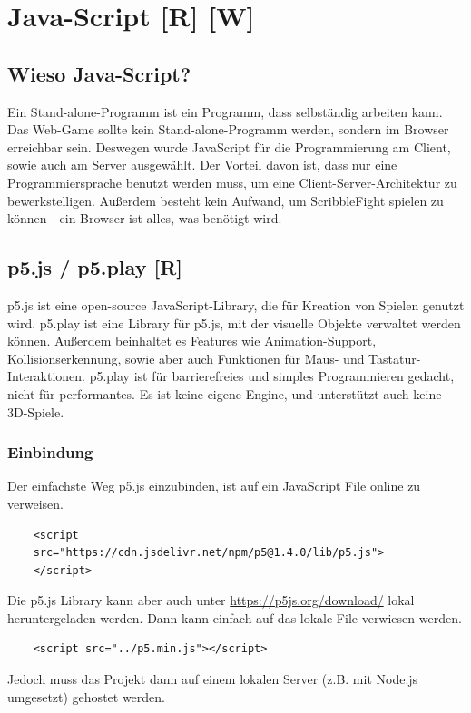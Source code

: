 
\section{Java-Script [R] [W]}
\subsection{Wieso Java-Script?}
Ein Stand-alone-Programm ist ein Programm, dass selbständig arbeiten kann.
Das Web-Game sollte kein Stand-alone-Programm werden, sondern im Browser erreichbar sein. Deswegen wurde JavaScript für die Programmierung am Client, sowie auch am Server ausgewählt.
Der Vorteil davon ist, dass nur eine Programmiersprache benutzt werden muss, um eine Client-Server-Architektur zu bewerkstelligen.
Außerdem besteht kein Aufwand, um ScribbleFight spielen zu können - ein Browser ist alles, was benötigt wird.
\subsection{p5.js / p5.play [R]}
\label{subsection:p5js}\cite{p5js}
p5.js ist eine open-source JavaScript-Library, die für Kreation von Spielen genutzt wird.
p5.play ist eine Library für p5.js, mit der visuelle Objekte verwaltet werden können. Außerdem beinhaltet es Features wie Animation-Support,
Kollisionserkennung, sowie aber auch Funktionen für Maus- und Tastatur-Interaktionen.
p5.play ist für barrierefreies und simples Programmieren gedacht, nicht für performantes.
Es ist keine eigene Engine, und unterstützt auch keine 3D-Spiele.

\subsubsection{Einbindung}
Der einfachste Weg p5.js einzubinden, ist auf ein JavaScript File online zu verweisen.

\begin{lstlisting}
    <script 
    src="https://cdn.jsdelivr.net/npm/p5@1.4.0/lib/p5.js">
    </script>
\end{lstlisting}
Die p5.js Library kann aber auch
unter \url{https://p5js.org/download/} lokal heruntergeladen werden.
Dann kann einfach auf das lokale File verwiesen werden.

\begin{lstlisting}
    <script src="../p5.min.js"></script>
\end{lstlisting}

Jedoch muss das Projekt dann auf einem lokalen Server (z.B. mit Node.js umgesetzt) gehostet werden.

